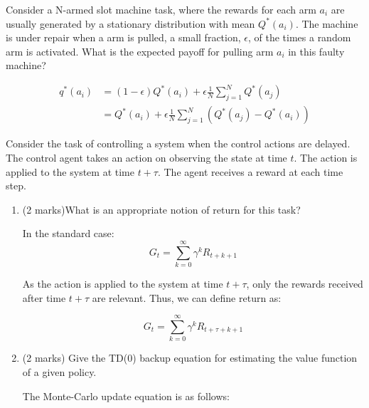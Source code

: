 \documentclass[addpoints,12pt,solution]{exam}
\begin{document}
\begin{questions}

 Consider a N-armed slot machine task, where the rewards for
each arm $a_i$ are usually generated by a stationary distribution with mean $Q^{*}(a_i)$. The machine is under repair when a arm is pulled, a small fraction, $\epsilon$, of the times a random arm is activated. What is the expected payoff for pulling arm $a_i$ in this faulty machine?

\begin{solution}
\begin{align*}
q^*(a_i) & = (1-\epsilon) Q^*(a_i) + \epsilon \frac{1}{N} \sum_{j = 1}^{N} {Q^*(a_j)} \\
    & = Q^*(a_i) +  \epsilon \frac{1}{N} \sum_{j = 1}^{N} {(Q^*(a_j)-Q^*(a_i))}
\end{align*}
\end{solution}


 Consider the task of controlling a system when the control actions are delayed. The control agent takes an action on observing the state at time $t$. The action is applied to the system at time $t + \tau$. The agent
receives a reward at each time step.
\begin{enumerate}[label=(\alph*)]

\item (2 marks)What is an appropriate notion of return for this task?

\begin{solution}

    In the standard case:
    \[G_t = \sum_{k=0}^{\infty} \gamma^{k}R_{t + k + 1}\]

    As the action is applied to the system at time $t + \tau$, only the rewards received after time $t + \tau$ are relevant.
    Thus, we can define return as:

    \[G_t = \sum_{k=0}^{\infty} \gamma^{k}R_{t + \tau + k + 1}\]

\end{solution}

\item (2 marks) Give the TD(0) backup equation for estimating the value function of a given policy.

\begin{solution}

The Monte-Carlo update equation is as follows:


\end{solution}
\end{enumerate}
\end{questions}
\end{document}
